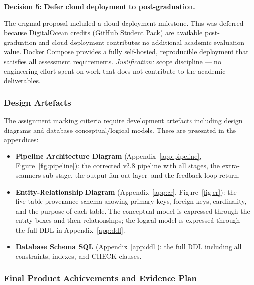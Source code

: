 \documentclass[12pt,a4paper]{article}
\begin{document}
\textbf{Decision 5: Defer cloud deployment to post-graduation.}

The original proposal included a cloud deployment milestone.  This was deferred
because DigitalOcean credits (GitHub Student Pack) are available post-graduation
and cloud deployment contributes no additional academic evaluation value.  Docker
Compose provides a fully self-hosted, reproducible deployment that satisfies all
assessment requirements.  \emph{Justification:} scope discipline --- no engineering
effort spent on work that does not contribute to the academic deliverables.

\subsubsection{Design Artefacts}

The assignment marking criteria require development artefacts including design
diagrams and database conceptual/logical models.  These are presented in the
appendices:

\begin{itemize}[leftmargin=1.5em]
  \item \textbf{Pipeline Architecture Diagram} (Appendix~\ref{app:pipeline},
  Figure~\ref{fig:pipeline}): the corrected v2.8 pipeline with all stages, the
  extra-scanners sub-stage, the output fan-out layer, and the feedback loop return.

  \item \textbf{Entity-Relationship Diagram} (Appendix~\ref{app:er},
  Figure~\ref{fig:er}): the five-table provenance schema showing primary keys,
  foreign keys, cardinality, and the purpose of each table.  The conceptual model
  is expressed through the entity boxes and their relationships; the logical model
  is expressed through the full DDL in Appendix~\ref{app:ddl}.

  \item \textbf{Database Schema SQL} (Appendix~\ref{app:ddl}): the full DDL
  including all constraints, indexes, and CHECK clauses.
\end{itemize}

\subsubsection{Final Product Achievements and Evidence Plan}
\end{document}
